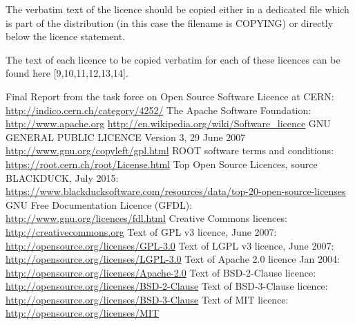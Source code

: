 \documentclass[12pt,a4paper]{article}
\begin{document}
The verbatim text of the licence should be copied either in a dedicated file which is part of the distribution (in this case the filename is COPYING) or directly below the licence statement.

The text of each licence to be copied verbatim for each of these licences can be found here [9,10,11,12,13,14].

\begin{thebibliography}{9}
\bibitem{[1]} Final Report from the task force on Open Source Software Licence at CERN: \url{http://indico.cern.ch/category/4252/}
\bibitem{[2]} The Apache Software Foundation: \url{http://www.apache.org}
\bibitem{[3]} \url{http://en.wikipedia.org/wiki/Software_licence}
\bibitem{[4]} GNU GENERAL PUBLIC LICENCE Version 3, 29 June 2007 \url{http://www.gnu.org/copyleft/gpl.html}
\bibitem{[5]} ROOT software terms and conditions: \url{https://root.cern.ch/root/License.html}
\bibitem{[6]} Top Open Source Licences, source BLACKDUCK, July 2015: \url{https://www.blackducksoftware.com/resources/data/top-20-open-source-licenses}
\bibitem{[7]} GNU Free Documentation Licence (GFDL): \url{http://www.gnu.org/licences/fdl.html}
\bibitem{[8]} Creative Commons licences: \url{http://creativecommons.org}
\bibitem{[9]} Text of GPL v3 licence, June 2007: \url{http://opensource.org/licenses/GPL-3.0} 
\bibitem{[10]} Text of LGPL v3 licence, June 2007: \url{http://opensource.org/licenses/LGPL-3.0}
\bibitem{[11]} Text of Apache 2.0 licence Jan 2004: \url{http://opensource.org/licenses/Apache-2.0}
\bibitem{[12]} Text of BSD-2-Clause licence: \url{http://opensource.org/licenses/BSD-2-Clause}
\bibitem{[13]} Text of BSD-3-Clause licence: \url{http://opensource.org/licenses/BSD-3-Clause}
\bibitem{[14]} Text of MIT licence: \url{http://opensource.org/licenses/MIT}
\end{thebibliography}

\end{document}
